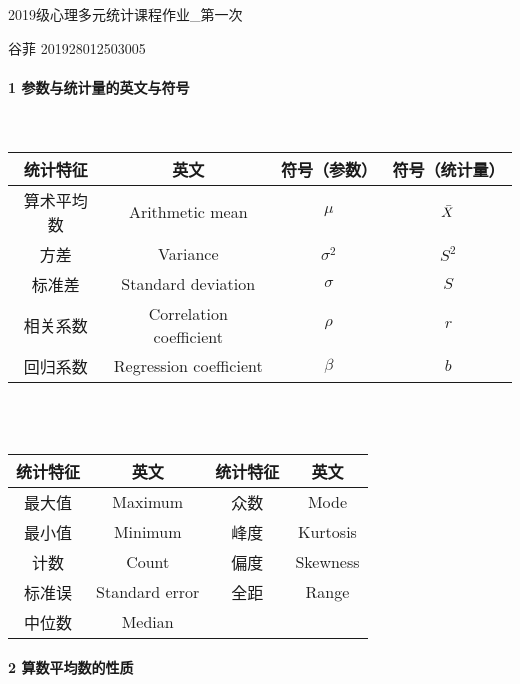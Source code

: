 \documentclass[UTF8]{ctexart}
\begin{document}
\begin{center}
	\LARGE
	2019级心理多元统计课程作业\_第一次

	\normalsize
	谷菲 201928012503005
\end{center}

\paragraph{1 参数与统计量的英文与符号}
~\\
%
%
\begin{tabular}{cccc}
    \toprule
    统计特征 & 英文 & 符号（参数） & 符号（统计量）\\
    \midrule
     算术平均数 & Arithmetic mean            &$\mu$ & $\Bar{X}$     \\
     方差       & Variance                   &$\sigma^2$ & $S^2$         \\
     标准差     & Standard deviation         &$\sigma$ & $S$           \\
     相关系数   & Correlation coefficient    &$\rho$ & $r$      \\
     回归系数   & Regression coefficient     &$\beta$ & $b$    \\
     \bottomrule
\end{tabular}
\\
\\

\begin{tabular}{cccc}
	\toprule
	统计特征 & 英文 & 统计特征 & 英文\\
	\midrule
	最大值   & Maximum          &众数 &Mode     \\
	最小值   & Minimum            	 &峰度 &Kurtosis         \\
	计数     & Count       &偏度 & Skewness           \\
	标准误   & Standard error &全距 & Range      \\
	中位数   & Median		\\
	\bottomrule
\end{tabular}

\paragraph{2 算数平均数的性质}
~\\
\end{document}
